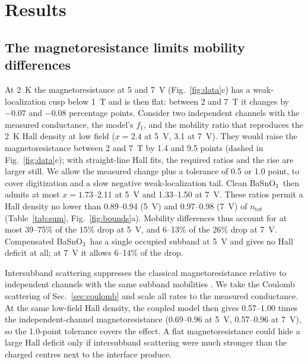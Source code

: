 \documentclass[11pt]{article}
\newcommand{\BSO}{\texorpdfstring{BaSnO$_3$}{BaSnO3}}
\newcommand{\ntot}{n_\mathrm{tot}}
\begin{document}
\section{Results}
\subsection{The magnetoresistance limits mobility differences}\label{sec:mr}
At 2~K the magnetoresistance at 5 and 7~V (Fig.~\ref{fig:data}c) has a weak-localization cusp below 1~T and is then flat: between 2 and 7~T it changes by $-0.07$ and $-0.08$ percentage points. Consider two independent channels with the measured conductance, the model's $f_1$, and the mobility ratio that reproduces the 2~K Hall density at low field ($x=2.4$ at 5~V, 3.1 at 7~V). They would raise the magnetoresistance between 2 and 7~T by 1.4 and 9.5 points (dashed in Fig.~\ref{fig:data}c); with straight-line Hall fits, the required ratios and the rise are larger still. We allow the measured change plus a tolerance of 0.5 or 1.0 point, to cover digitization and a slow negative weak-localization tail. Clean \BSO\ then admits at most $x=1.73$--2.11 at 5~V and 1.33--1.50 at 7~V. These ratios permit a Hall density no lower than 0.89--0.94 (5~V) and 0.97--0.98 (7~V) of $\ntot$ (Table~\ref{tab:sum}, Fig.~\ref{fig:bounds}a). Mobility differences thus account for at most 39--75\% of the 15\% drop at 5~V, and 6--13\% of the 26\% drop at 7~V. Compensated \BSO\ has a single occupied subband at 5~V and gives no Hall deficit at all; at 7~V it allows 6--14\% of the drop.

Intersubband scattering suppresses the classical magnetoresistance relative to independent channels with the same subband mobilities \cite{Zaremba1992}. We take the Coulomb scattering of Sec.~\ref{sec:coulomb} and scale all rates to the measured conductance. At the same low-field Hall density, the coupled model then gives 0.57--1.00 times the independent-channel magnetoresistance (0.69--0.96 at 5~V, 0.57--0.96 at 7~V), so the 1.0-point tolerance covers the effect. A flat magnetoresistance could hide a large Hall deficit only if intersubband scattering were much stronger than the charged centres next to the interface produce.
\end{document}
